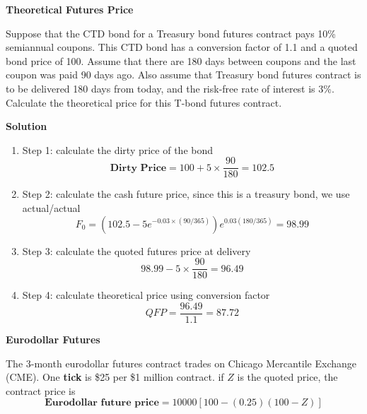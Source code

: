 \documentclass[11pt,fleqn]{report} %
\numberwithin{equation}{section} %
\numberwithin{figure}{section} %
\numberwithin{table}{section} %
\begin{document}
  \begin{exercise}\textbf{Theoretical Futures Price}
 
Suppose that the CTD bond for a Treasury bond futures contract pays 10\% semiannual
coupons. This CTD bond has a conversion factor of 1.1 and a quoted bond price of
100. Assume that there are 180 days between coupons and the last coupon was paid 90
days ago. Also assume that Treasury bond futures contract is to be delivered 180 days
from today, and the risk-free rate of interest is 3\%. Calculate the theoretical price for this
T-bond futures contract.
 
 
 \textbf{Solution}
 \begin{enumerate}
     \item Step 1: calculate the dirty price of the bond
     $$
     \textbf{Dirty Price}=100+5\times\frac{90}{180}=102.5
     $$
     \item Step 2: calculate the cash future price, since this is a treasury bond, we use actual/actual
     $$
     F_0=(102.5-5e^{-0.03\times(90/365)})e^{0.03(180/365)}=98.99
     $$
     \item Step 3: calculate the quoted futures price at delivery
     $$
     98.99-5\times\frac{90}{180}=96.49
     $$
     \item Step 4: calculate theoretical price using conversion factor
     $$
     QFP=\frac{96.49}{1.1}=87.72
     $$
 \end{enumerate}
 \end{exercise}
 \begin{definition}\textbf{Eurodollar Futures}
 
 The 3-month eurodollar futures contract trades on Chicago Mercantile Exchange (CME). One \textbf{tick} is \$25 per \$1 million contract. if $Z$ is the quoted price, the contract price is
 $$
 \textbf{Eurodollar future price}=10000[100-(0.25)(100-Z)]
 $$
 \end{definition}
\end{document}
